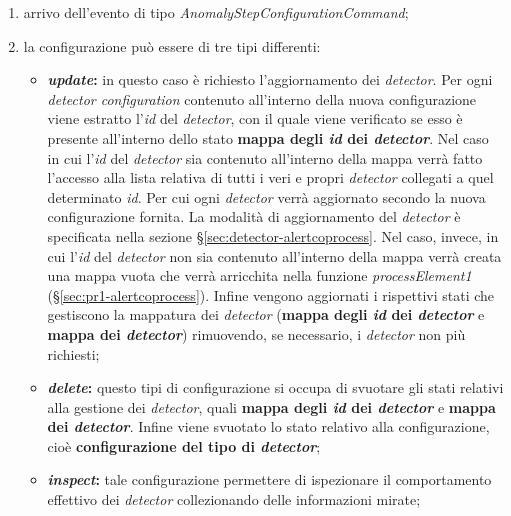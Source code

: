\begin{enumerate}
	\item{arrivo dell'evento di tipo \textit{AnomalyStepConfigurationCommand};}
	\item{la configurazione può essere di tre tipi differenti:
	\begin{itemize}
		\item{\textbf{\textit{update}:} in questo caso è richiesto l'aggiornamento dei \textit{detector}. Per ogni \textit{detector configuration} contenuto all'interno della nuova configurazione viene estratto l'\textit{id} del \textit{detector}, con il quale viene verificato se esso è presente all'interno dello stato \textbf{mappa degli \textit{id} dei \textit{detector}}. Nel caso in cui l'\textit{id} del \textit{detector} sia contenuto all'interno della mappa verrà fatto l'accesso alla lista relativa di tutti i veri e propri \textit{detector} collegati a quel determinato \textit{id}. Per cui ogni \textit{detector} verrà aggiornato secondo la nuova configurazione fornita. La modalità di aggiornamento del \textit{detector} è specificata nella sezione \S\ref{sec:detector-alertcoprocess}. Nel caso, invece, in cui l'\textit{id} del \textit{detector} non sia contenuto all'interno della mappa verrà creata una mappa vuota che verrà arricchita nella funzione \textit{processElement1} (\S\ref{sec:pr1-alertcoprocess}). Infine vengono aggiornati i rispettivi stati che gestiscono la mappatura dei \textit{detector} (\textbf{mappa degli \textit{id} dei \textit{detector}} e \textbf{mappa dei \textit{detector}}) rimuovendo, se necessario, i \textit{detector} non più richiesti;}
		\item{\textbf{\textit{delete}:} questo tipi di configurazione si occupa di svuotare gli stati relativi alla gestione dei \textit{detector}, quali \textbf{mappa degli \textit{id} dei \textit{detector}} e \textbf{mappa dei \textit{detector}}. Infine viene svuotato lo stato relativo alla configurazione, cioè \textbf{configurazione del tipo di \textit{detector}};}
		\item{\textbf{\textit{inspect}:} tale configurazione permettere di ispezionare il comportamento effettivo dei \textit{detector} collezionando delle informazioni mirate;}
	\end{itemize}}
\end{enumerate}


